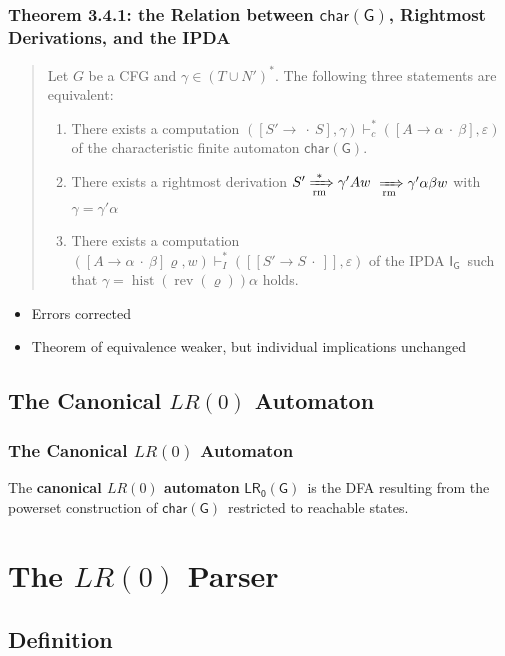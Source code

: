 \documentclass{beamer}
\newcommand{\concept}[1]{\textbf{#1}}
\newcommand{\cfitem}[3]{\ensuremath{{[#1 \to #2 \:\cdot\: #3]}}}
\newcommand{\derivera}{\ensuremath{\xRightarrow[\mathrm{rm}]{}}}
\newcommand{\deriversa}{\ensuremath{\xRightarrow[\mathrm{rm}]{*}}}
\newcommand{\derivers}[2]{\ensuremath{{#1} \deriversa {#2}}}
\newcommand{\symse}{\ensuremath{{(T \cup N')}^*}}
\newcommand{\ipda}{\ensuremath{\mathsf{{I}_G}}}
\newcommand{\charfa}{\ensuremath{\mathsf{char(G)}}}
\newcommand{\lrdfa}{\ensuremath{\mathsf{LR_0(G)}}}
\DeclareMathOperator{\hist}{hist}
\DeclareMathOperator{\rev}{rev}
\begin{document}
\begin{frame}\label{thm341}
  \frametitle{Theorem 3.4.1: the Relation between \charfa, Rightmost Derivations, 
  and the IPDA}
  \begin{quote}
    Let $G$ be a CFG and $\gamma \in \symse $. The following three
    statements are equivalent:
    \begin{enumerate}
      \item There exists a computation
      $(\cfitem{S'}{}{S}, \gamma) \vdash_c^* (\cfitem{A}{\alpha}{\beta}, \varepsilon)$
      of the characteristic finite automaton \charfa.
      \item There exists a rightmost derivation 
      \mbox{\derivers{S'}{\gamma' A w} $\derivera \gamma' \alpha \beta w$} with
      $\gamma = \gamma' \alpha$
      \item There exists a computation 
      $(\cfitem{A}{\alpha}{\beta} \varrho, w)
        \vdash_I^* ([\cfitem{S'}{S}{}] ,\varepsilon)$ of the IPDA \ipda\ such 
        that $\gamma = \hist (\rev (\varrho)) \alpha$ holds.
    \end{enumerate}
  \end{quote}
  \begin{itemize}
    \item Errors corrected
    \item Theorem of equivalence weaker, but individual implications unchanged
  \end{itemize}
\end{frame}

\subsection{The Canonical $LR(0)$ Automaton}

\begin{frame}
  \frametitle{The Canonical $LR(0)$ Automaton}
  \begin{definition}
    The \concept{canonical $LR(0)$ automaton} \lrdfa\ is the
    DFA resulting from the powerset construction of \charfa\ restricted to
    reachable states.
  \end{definition}
\end{frame}

\section{The $LR(0)$ Parser}

\subsection{Definition}
\end{document}
